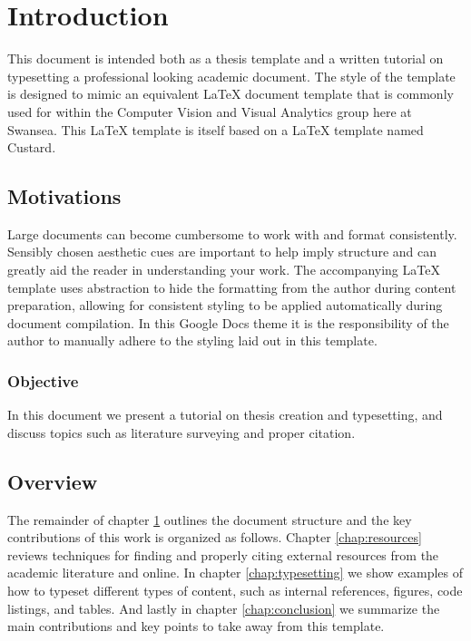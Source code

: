 \chapter{Introduction}
	\label{chap:intro}
	
	This document is intended both as a thesis template and a written tutorial on typesetting a professional looking academic document. The style of the template is designed to mimic an equivalent LaTeX document template that is commonly used for within the Computer Vision and Visual Analytics group here at Swansea. This LaTeX template is itself based on a LaTeX template named Custard. 
	
	\section{Motivations}
		\label{sec:intro_motivation} 
		
		Large documents can become cumbersome to work with and format consistently. Sensibly chosen aesthetic cues are important to help imply structure and can greatly aid the reader in understanding your work. The accompanying LaTeX template uses abstraction to hide the formatting from the author during content preparation, allowing for consistent styling to be applied automatically during document compilation. In this Google Docs theme it is the responsibility of the author to manually adhere to the styling laid out in this template. \cite{hsin2013practitioner}
	
	\subsection{Objective}
		\label{sec:intro_objective} 
		
		In this document we present a tutorial on thesis creation and typesetting, and discuss topics such as literature surveying and proper citation. 
		
	\section{Overview}  
		\label{sec:intro_overview} 
		
		The remainder of chapter \ref{chap:intro} outlines the document structure and the key contributions of this work is organized as follows. Chapter \ref{chap:resources} reviews techniques for finding and properly citing external resources from the academic literature and online. In chapter \ref{chap:typesetting} we show examples of how to typeset different types of content, such as internal references, figures, code listings, and tables. And lastly in chapter \ref{chap:conclusion} we summarize the main contributions and key points to take away from this template.
	
